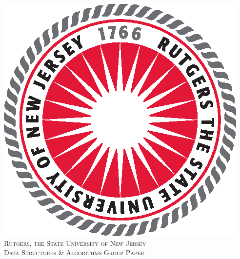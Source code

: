 \begin{titlepage}

\newcommand{\HRule}{\rule{\linewidth}{0.5mm}} %

\center %


\includegraphics{RU_INF_SEAL}\\[1cm] %
 
 

\textsc{\LARGE Rutgers, the State University of New Jersey}\\[1.5cm] %
\textsc{\Large Data Structures \& Algorithms Group Paper}\\[0.5cm] %


\end{titlepage}
